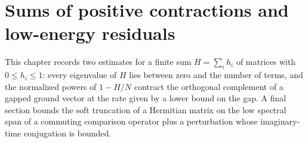 \chapter{Sums of positive contractions and low-energy residuals}
\label{ch:contraction_sums}

This chapter records two estimates for a finite sum $H=\sum_i h_i$ of
matrices with $0\le h_i\le1$: every eigenvalue of $H$ lies between zero
and the number of terms, and the normalized powers of $1-H/N$ contract the
orthogonal complement of a gapped ground vector at the rate given by a lower
bound on the gap. A final section bounds the soft truncation of a Hermitian
matrix on the low spectral span of a commuting comparison operator plus a
perturbation whose imaginary-time conjugation is bounded.



